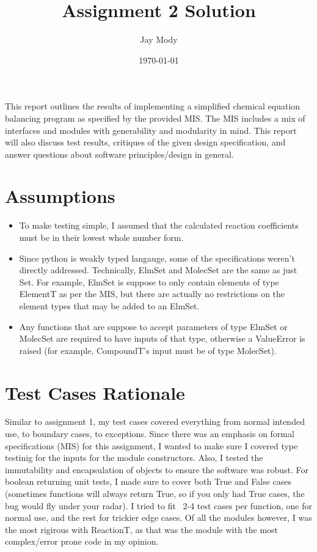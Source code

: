 \documentclass[12pt]{article}
\title{Assignment 2 Solution}
\author{Jay Mody}
\date{\today}
\begin{document}
\maketitle


This report outlines the results of implementing a simplified chemical equation balancing program as specified by the provided MIS. The MIS includes a mix of interfaces and modules with generability and modularity in mind. This report will also discuss test results, critiques of the given design specification, and answer questions about software principles/design in general.


\section{Assumptions}
\begin{itemize}
    \item To make testing simple, I assumed that the calculated reaction coefficients must be in their lowest whole number form.
    \item Since python is weakly typed langauge, some of the specifications weren't directly addressed. Technically, ElmSet and MolecSet are the same as just Set. For example, ElmSet is suppose to only contain elements of type ElementT as per the MIS, but there are actually no restrictions on the element types that may be added to an ElmSet.
    \item Any functions that are suppose to accept parameters of type ElmSet or MolecSet are required to have inputs of that type, otherwise a ValueError is raised (for example, CompoundT's input must be of type MolecSet).
\end{itemize}


\clearpage
\section{Test Cases Rationale}
Similar to assignment 1, my test cases covered everything from normal intended use, to boundary cases, to exceptions. Since there was an emphasis on formal specifications (MIS) for this assignment, I wanted to make sure I covered type testinig for the inputs for the module constructors. Also, I tested the immutability and encapsulation of objects to ensure the software was robust. For boolean returning unit tests, I made sure to cover both True and False cases (sometimes functions will always return True, so if you only had True cases, the bug would fly under your radar). I tried to fit ~2-4 test cases per function, one for normal use, and the rest for trickier edge cases. Of all the modules however, I was the most rigirous with ReactionT, as that was the module with the most complex/error prone code in my opinion.
\end{document}
